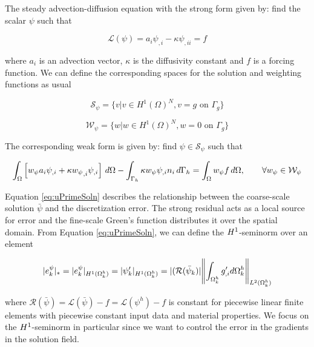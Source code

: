 

The steady advection-diffusion equation with the strong form given by: find the scalar $\psi$ such that

\begin{equation}
\mathcal{L}(\psi) = a_i \psi_{,i} - \kappa \psi_{,ii} = f
\end{equation}

\noindent where $a_i$ is an advection vector, $\kappa$ is the diffusivity constant and $f$
is a forcing function.
We can define the corresponding spaces for the solution and weighting functions as usual

\begin{equation}
\label{eq:testspace}
\mathcal{S}_{\psi} = \{ v| v \in H^1(\Omega)^N, v = g \text{ on } \Gamma_g\} 
\end{equation}

\begin{equation}
\label{eq:Vweightspace}
\mathcal{W}_{\psi} = \{ w|w \in H^1(\Omega)^N, w = 0 \text{ on } \Gamma_g\}
\end{equation}

\noindent The corresponding weak form is given by: find $\psi \in \mathcal{S}_{\psi}$ such that

\begin{equation} 
\int_\Omega \left[ w_{\psi} a_i \psi_{,i} + \kappa {w_{\psi}}_{,i}\psi_{,i}\right] \, d\Omega- 
\int_{\Gamma_h} \kappa w_{\psi} \psi_{,i} n_i\, d\Gamma_h = 
\int_\Omega w_{\psi} f \, d\Omega, \qquad \forall w_{\psi} \in \mathcal{W}_{\psi}
\label{eq:AD_model}
\end{equation}

Equation \ref{eq:uPrimeSoln} describes the relationship between the coarse-scale solution $\bar{\psi}$ and the discretization error.
The strong residual acts as a local source for error and the fine-scale Green's function distributes it over the spatial domain.
From Equation \ref{eq:uPrimeSoln}, we can define the $H^{1}$-seminorm over an element

\begin{equation}
    |e^{\psi}_k|_* = |e^{\psi}_k|_{H^{1}(\Omega^h_k)} = |\psi'_k|_{H^{1}(\Omega^h_{k})}= |(\mathcal{R}(\bar{\psi}_k)| \norm{ \int_{\Omega^{h}_{k}} g_{,i}' d\Omega^h_{k}}_{L^2(\Omega^h_k)}
\end{equation}

\noindent where $\mathcal{R}(\bar{\psi})=\mathcal{L}(\bar{\psi})-f=\mathcal{L}(\psi^h)-f$ is constant for piecewise linear finite elements with piecewise constant input data and material properties.
We focus on the $H^{1}$-seminorm in particular since we want to control the error in the gradients in the solution field.

